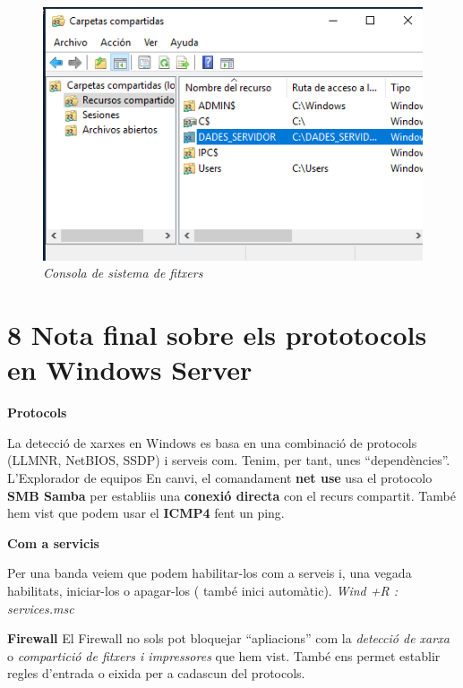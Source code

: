 \documentclass[
  a4paper,
]{article}
\begin{document}
\begin{figure}
\centering
\includegraphics{png/ADDS/fsmgmt.png}
\caption{\emph{Consola de sistema de fitxers}}
\end{figure}

\section{8 Nota final sobre els prototocols en Windows
Server}\label{nota-final-sobre-els-prototocols-en-windows-server}

\textbf{Protocols}

La detecció de xarxes en Windows es basa en una combinació de protocols
(LLMNR, NetBIOS, SSDP) i serveis com. Tenim, per tant, unes
``dependències''. L'Explorador de equipos En canvi, el comandament
\textbf{net use} usa el protocolo \textbf{SMB Samba} per establiis una
\textbf{conexió directa} con el recurs compartit. També hem vist que
podem usar el \textbf{ICMP4} fent un ping.

\textbf{Com a servicis}

Per una banda veiem que podem habilitar-los com a serveis i, una vegada
habilitats, iniciar-los o apagar-los ( també inici automàtic).
\emph{Wind +R : services.msc}

\textbf{Firewall} El Firewall no sols pot bloquejar ``apliacions'' com
la \emph{detecció de xarxa} o \emph{compartició de fitxers i
impressores} que hem vist. També ens permet establir regles d'entrada o
eixida per a cadascun del protocols.
\end{document}
